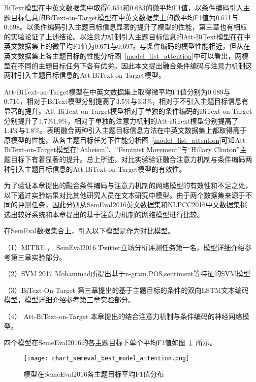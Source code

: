 BiText模型在中英文数据集中取得0.654和0.683的微平均F1值，以条件编码引入主题目标信息的BiText-on-Target模型在中英文数据集上的微平均F1值为0.671与0.698。以条件编码引入主题目标信息显著的提升了模型的性能，第三章也有相应的实验论证了上述结论。以注意力机制引入主题目标信息的Att-BiText模型在在中英文数据集上的微平均F1值为0.671与0.697。与条件编码的模型性能相近，但从在英文数据集上各主题目标的性能分析图~\ref{model_list_attention}中可以看出，两模型在不同的主题目标任务下各有优劣。因此本文提出融合条件编码与注意力机制这两种引入主题目标信息的Att-BiText-on-Target模型。

Att-BiText-on-Target模型在中英文数据集上取得微平均F1值分别为0.689与0.716，相对于BiText模型分别提高了3.5\%与3.3\%，相对于不引入主题目标信息有显著的提升。Att-BiText-on-Target模型相对于单独的条件编码的BiText-on-Target分别提升了1.7\%1.9\%，相对于单独的注意力机制的Att-BiText模型分别提高了1.4\%与1.8\%。表明融合两种引入主题目标信息方法在中英文数据集上都取得高于原模型的性能，从各主题目标任务下性能分析图~\ref{model_list_attention}可知Att-BiText-on-Target模型在“Atheism”、“Feminist Movement”与“Hillary Clinton”主题目标下有着显著的提升。总上所述，对比实验验证融合注意力机制与条件编码两种引入主题目标信息的Att-BiText-on-Target模型的有效性。

为了验证本章提出的融合条件编码与注意力机制的网络模型的有效性和不足之处，以下通过实验结果对比其他研究人员在文本研究中模型。由于两个数据集来源于不同的评测任务，因此分别从SemEval2016英文数据集和NLPCC2016中文数据集挑选出较好系统和本章提出的基于注意力机制的网络模型进行比较。

在SemEval数据集合上，引入以下模型是作为对比模型。

（1）MITRE ， SemEval2016 Twitter立场分析评测任务第一名，模型详细介绍参考第三章实验部分。

（2）SVM   2017 Mohammad所提出基于n-gram,POS,sentiment等特征的SVM模型

（3）BiText-On-Target 第三章提出的基于主题目标的条件的双向LSTM文本编码模型，模型详细介绍参考第三章实验部分。

（4） Att-BiText-on-Target 本章提出的结合注意力机制与条件编码的神经网络模型。

四个模型在SemeEval2016的各主题目标下单个平均F1值如图~\ref{chart_semeval_best_model_attention}~所示。
\begin{figure}[htbp]
	\centering
	\texttt{[image: chart\_semeval\_best\_model\_attention.png]}
	\caption[rnn_vanish]{模型在SemeEval2016各主题目标平均F1值分布}
	\label{chart_semeval_best_model_attention}
\end{figure}

